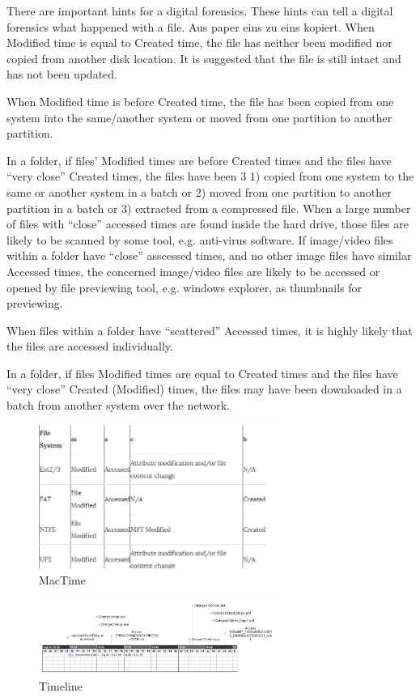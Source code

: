 \newline \newline There are important hints for a digital forensics. These hints can tell a digital forensics what happened with a file. Aus paper eins zu eins kopiert.
When Modified time is equal to Created time, the file has neither been modified nor copied from another disk location. It is suggested that the file is still intact and has not been updated.

When Modified time is before Created time, the file has been copied from one system into the same/another system or moved from one partition to another partition.

In a folder, if files’ Modified times are before Created times and the files have “very close” Created times, the files have been 3
1) copied from one system to the same or another system in a
batch or
2) moved from one partition to another partition in a batch
or
3) extracted from a compressed file.
When a large number of files with “close” accessed times are found inside the hard drive, those files are likely to be scanned by some tool, e.g. anti-virus software.
If image/video files within a folder have “close” asscessed times, and no other image files have similar Accessed times,
the concerned image/video files are likely to be accessed or opened by file previewing tool, e.g. windows explorer, as
thumbnails for previewing.

When files within a folder have “scattered” Accessed times, it is highly likely that the files are accessed individually.

In a folder, if files Modified times are equal to Created times and the files have “very close” Created (Modified) times, the files may have been downloaded in a batch from another system over the network.


\begin{figure}[tbph]
	\centering
	\includegraphics[width=0.7\textwidth]{graphics/mactime}
	\caption{MacTime}
	\label{fig:Mactime}
\end{figure}

\begin{figure}[tbph]
\centering
\includegraphics[width=0.7\textwidth]{graphics/timeline}
\caption{Timeline}
\label{fig:timeline}
\end{figure}
